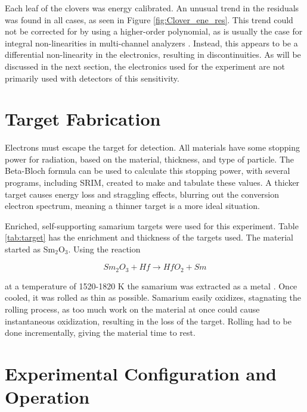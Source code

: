 

Each leaf of the clovers was energy calibrated. An unusual trend in the residuals was found in all cases, as seen in Figure \ref{fig:Clover_ene_res}. This trend could not be corrected for by using a higher-order polynomial, as is usually the case for integral non-linearities in multi-channel analyzers \citep{knoll00:rad_det_meas}. Instead, this appears to be a differential non-linearity in the electronics, resulting in discontinuities. As will be discussed in the next section, the electronics used for the experiment are not primarily used with detectors of this sensitivity.



\section{Target Fabrication}

Electrons must escape the target for detection. All materials have some stopping power for radiation, based on the material, thickness, and type of particle. The Beta-Bloch formula can be used to calculate this stopping power, with several programs, including SRIM, created to make and tabulate these values\citep{ziegler10:_srim}. A thicker target causes energy loss and straggling effects, blurring out the conversion electron spectrum, meaning a thinner target is a more ideal situation.

Enriched, self-supporting samarium targets were used for this experiment. Table \ref{tab:target} has the enrichment and thickness of the targets used. The material started as Sm$_2$O$_3$. Using the reaction

\begin{equation}
    Sm_2O_3 + Hf \xrightarrow{} HfO_2 + Sm
    \label{eq:sm_hf}
\end{equation}

at a temperature of 1520-1820 K the samarium was extracted as a metal \citep{clifford02:_target}. Once cooled, it was rolled as thin as possible. Samarium easily oxidizes, stagnating the rolling process, as too much work on the material at once could cause instantaneous oxidization, resulting in the loss of the target. Rolling had to be done incrementally, giving the material time to rest.



\section{Experimental Configuration and Operation}

